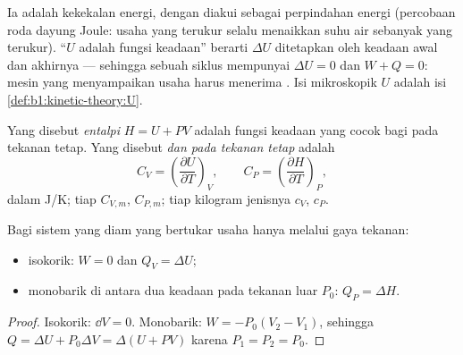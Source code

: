 \begin{remark}\label{rem:b1:first-law:meaning}
Ia adalah kekekalan energi, dengan  diakui sebagai perpindahan
energi (percobaan roda dayung Joule: usaha yang terukur selalu menaikkan
suhu air sebanyak  yang terukur). ``$U$ adalah fungsi
keadaan'' berarti $\Delta U$ ditetapkan oleh keadaan awal dan akhirnya ---
sehingga sebuah siklus mempunyai $\Delta U = 0$ dan $W + Q = 0$: mesin yang menyampaikan
usaha harus menerima . Isi mikroskopik $U$ adalah isi
\cref{def:b1:kinetic-theory:U}.
\end{remark}

\begin{definition}\label{def:b1:first-law:enthalpy}
Yang disebut \emph{entalpi} $H = U + PV$ adalah fungsi keadaan yang cocok bagi
 pada tekanan tetap. Yang disebut \emph{ dan pada tekanan tetap} adalah
\[
C_V = \left(\frac{\partial U}{\partial T}\right)_V, \qquad
C_P = \left(\frac{\partial H}{\partial T}\right)_P ,
\]
dalam \unit{J/K}; tiap  $C_{V,m}$, $C_{P,m}$; tiap kilogram 
jenisnya $c_V$, $c_P$.
\end{definition}

\begin{proposition}\label{prop:b1:first-law:qvqp}
Bagi sistem yang diam yang bertukar usaha hanya melalui gaya tekanan:
\begin{itemize}
  \item {} isokorik: $W = 0$ dan $Q_V = \Delta U$;
  \item {} monobarik di antara dua keadaan pada tekanan luar
        $P_0$: $Q_P = \Delta H$.
\end{itemize}
\end{proposition}

\begin{proof}
Isokorik: $\dd V = 0$. Monobarik: $W = -P_0(V_2 - V_1)$, sehingga $Q = \Delta U +
P_0\Delta V = \Delta(U + PV)$ karena $P_1 = P_2 = P_0$.
\end{proof}

